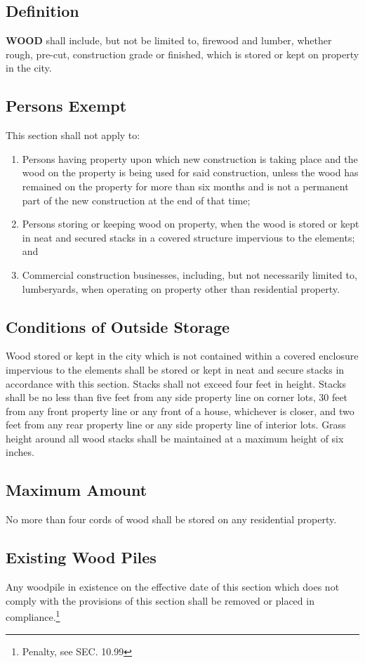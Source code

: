 \subsection{Definition}
\textbf{WOOD} shall include, but not be limited to, firewood and lumber, whether rough, pre-cut, construction grade or finished, which is stored or kept on property in the city.
\subsection{Persons Exempt}
This section shall not apply to:
\begin{enumerate}[{\indent}1)]
    \item Persons having property upon which new construction is taking place and the wood on the property is being used for said construction, unless the wood has remained on the property for more than six months and is not a permanent part of the new construction at the end of that time;
    \item Persons storing or keeping wood on property, when the wood is stored or kept in neat and secured stacks in a covered structure impervious to the elements; and
    \item Commercial construction businesses, including, but not necessarily limited to, lumberyards, when operating on property other than residential property.
\end{enumerate}
\subsection{Conditions of Outside Storage}
Wood stored or kept in the city which is not contained within a covered enclosure impervious to the elements shall be stored or kept in neat and secure stacks in accordance with this section.  Stacks shall not exceed four feet in height.  Stacks shall be no less than five feet from any side property line on corner lots, 30 feet from any front property line or any front of a house, whichever is closer, and two feet from any rear property line or any side property line of interior lots.  Grass height around all wood stacks shall be maintained at a maximum height of six inches.
\subsection{Maximum Amount}
No more than four cords of wood shall be stored on any residential property.
\subsection{Existing Wood Piles}
Any woodpile in existence on the effective date of this section which does not comply with the provisions of this section shall be removed or placed in compliance.\footnote{Penalty, see SEC. 10.99}
